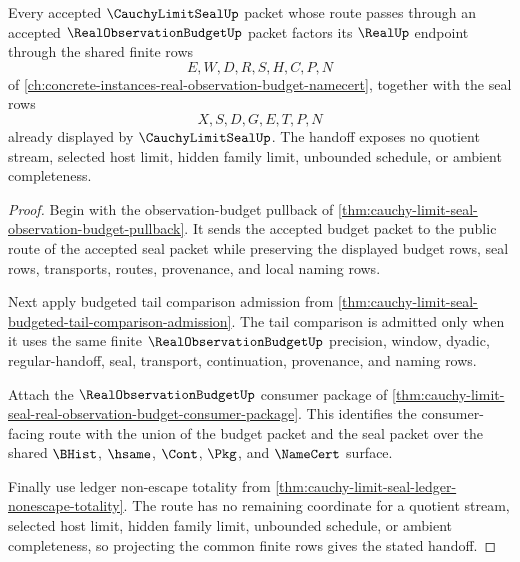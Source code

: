 \begin{theorem}
\label{thm:cauchy-limit-seal-real-observation-budget-handoff}
Every accepted $\CauchyLimitSealUp$ packet whose route passes through an
accepted $\RealObservationBudgetUp$ packet factors its $\RealUp$ endpoint
through the shared finite rows
$$
E,W,D,R,S,H,C,P,N
$$
of \autoref{ch:concrete-instances-real-observation-budget-namecert}, together
with the seal rows
$$
X,S,D,G,E,T,P,N
$$
already displayed by $\CauchyLimitSealUp$. The handoff exposes no quotient
stream, selected host limit, hidden family limit, unbounded schedule, or
ambient completeness.
\end{theorem}
\begin{proof}
Begin with the observation-budget pullback of
\autoref{thm:cauchy-limit-seal-observation-budget-pullback}. It sends the
accepted budget packet to the public route of the accepted seal packet while
preserving the displayed budget rows, seal rows, transports, routes,
provenance, and local naming rows.

Next apply budgeted tail comparison admission from
\autoref{thm:cauchy-limit-seal-budgeted-tail-comparison-admission}. The tail
comparison is admitted only when it uses the same finite
$\RealObservationBudgetUp$ precision, window, dyadic, regular-handoff, seal,
transport, continuation, provenance, and naming rows.

Attach the $\RealObservationBudgetUp$ consumer package of
\autoref{thm:cauchy-limit-seal-real-observation-budget-consumer-package}. This
identifies the consumer-facing route with the union of the budget packet and
the seal packet over the shared $\BHist$, $\hsame$, $\Cont$, $\Pkg$, and
$\NameCert$ surface.

Finally use ledger non-escape totality from
\autoref{thm:cauchy-limit-seal-ledger-nonescape-totality}. The route has no
remaining coordinate for a quotient stream, selected host limit, hidden family
limit, unbounded schedule, or ambient completeness, so projecting the common
finite rows gives the stated handoff.
\end{proof}

